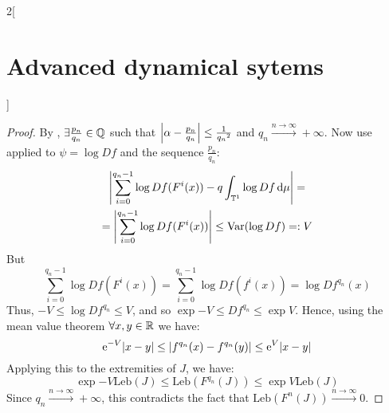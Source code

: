 \documentclass[../../../main_math.tex]{subfiles}
\begin{document}
\begin{multicols}{2}[\section{Advanced dynamical sytems}]
\begin{proof}
    By , $\exists \frac{p_n}{q_n}\in\mathbb{Q}$ such that $\abs{\alpha-\frac{p_n}{q_n}}\leq \frac{1}{{q_n}^2}$ and $q_n\overset{n\to\infty}{\longrightarrow}+\infty$. Now use  applied to $\psi=\log Df$ and the sequence $\frac{p_n}{q_n}$:
    \begin{multline*}
      \abs{\sum_{i=0}^{q_n-1}\log Df(F^i(x))-q\int_{\mathbb{T}^1}\log Df\dd{\mu}}=\\=\abs{\sum_{i=0}^{q_n-1}\log Df(F^i(x))}\leq\mathrm{Var}(\log Df)=:V
    \end{multline*}
    But $$
      \sum_{i=0}^{q_n-1}\log Df(F^i(x))=\sum_{i=0}^{q_n-1}\log Df(f^i(x))=\log Df^{q_n}(x)
    $$
    Thus, $-V\leq \log Df^{q_n}\leq V$, and so $\exp{-V}\leq Df^{q_n}\leq \exp{V}$. Hence, using the mean value theorem $\forall x,y\in\mathbb{R}$ we have:
    $$
      \mathrm{e}^{-V}\abs{x-y}\leq \abs{f^{q_n}(x)-f^{q_n}(y)}\leq\mathrm{e}^{V}\abs{x-y}
    $$
    Applying this to the extremities of $J$, we have:
    $$
      \exp{-V}\text{Leb}(J)\leq \text{Leb}(F^{q_n}(J))\leq \exp{V}\text{Leb}(J)
    $$
    Since $q_n\overset{n\to\infty}{\longrightarrow}+\infty$, this contradicts the fact that $\text{Leb}(F^n(J))\overset{n\to\infty}{\longrightarrow}0$.
  \end{proof}
\end{multicols}
\end{document}
